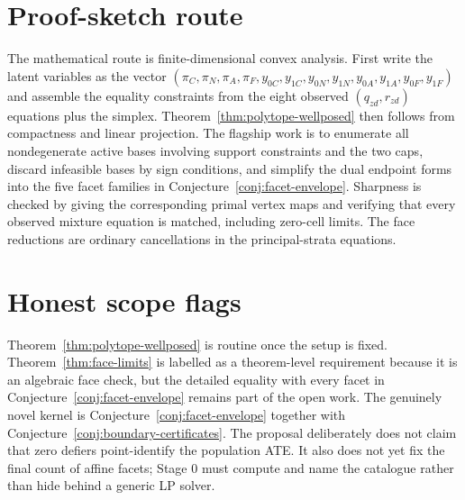 \documentclass[11pt]{article}
\theoremstyle{definition}
\theoremstyle{plain}
\theoremstyle{remark}
\begin{document}
\section{Proof-sketch route}
The mathematical route is finite-dimensional convex analysis.  First write the
latent variables as the vector
\((\pi_C,\pi_N,\pi_A,\pi_F,y_{0C},y_{1C},y_{0N},y_{1N},y_{0A},y_{1A},y_{0F},y_{1F})\)
and assemble the equality constraints from the eight observed
\((q_{zd},r_{zd})\) equations plus the simplex.  Theorem~\ref{thm:polytope-wellposed}
then follows from compactness and linear projection.  The flagship work is to
enumerate all nondegenerate active bases involving support constraints and the
two caps, discard infeasible bases by sign conditions, and simplify the dual
endpoint forms into the five facet families in
Conjecture~\ref{conj:facet-envelope}.  Sharpness is checked by giving the
corresponding primal vertex maps and verifying that every observed mixture
equation is matched, including zero-cell limits.  The face reductions are
ordinary cancellations in the principal-strata equations.

\section{Honest scope flags}
Theorem~\ref{thm:polytope-wellposed} is routine once the setup is fixed.
Theorem~\ref{thm:face-limits} is labelled as a theorem-level requirement
because it is an algebraic face check, but the detailed equality with every
facet in Conjecture~\ref{conj:facet-envelope} remains part of the open work.
The genuinely novel kernel is Conjecture~\ref{conj:facet-envelope} together
with Conjecture~\ref{conj:boundary-certificates}.  The proposal deliberately
does not claim that zero defiers point-identify the population ATE.  It also
does not yet fix the final count of affine facets; Stage 0 must compute and
name the catalogue rather than hide behind a generic LP solver.
\end{document}
